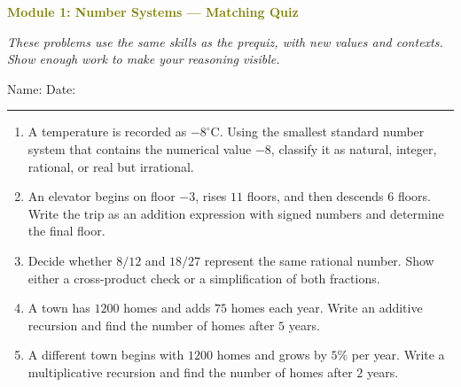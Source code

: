 \documentclass[11pt]{article}
\newcommand{\quizhead}[2]{%
  \clearpage
  {\Large\bfseries\textcolor{olive}{Module #1: #2 — Matching Quiz}}\par
  \textit{These problems use the same skills as the prequiz, with new values and contexts. Show enough work to make your reasoning visible.}\par
  Name: \hspace{2.6in} Date: \hspace{1.1in}\par
  \vspace{2pt}\textcolor{gold}{\rule{\linewidth}{1.2pt}}\par\smallskip
}
\newcommand{\worksmall}{\par\vspace{0.38in}}
\newcommand{\workmed}{\par\vspace{0.62in}}
\begin{document}
\quizhead{1}{Number Systems}
\begin{enumerate}
\item A temperature is recorded as \(-8^\circ\text{C}\). Using the smallest standard number system that contains the numerical value \(-8\), classify it as natural, integer, rational, or real but irrational.
\worksmall

\item An elevator begins on floor \(-3\), rises \(11\) floors, and then descends \(6\) floors. Write the trip as an addition expression with signed numbers and determine the final floor.
\workmed

\item Decide whether \(8/12\) and \(18/27\) represent the same rational number. Show either a cross-product check or a simplification of both fractions.
\workmed

\item A town has \(1200\) homes and adds \(75\) homes each year. Write an additive recursion and find the number of homes after \(5\) years.
\workmed

\item A different town begins with \(1200\) homes and grows by \(5\%\) per year. Write a multiplicative recursion and find the number of homes after \(2\) years.
\workmed
\end{enumerate}
\end{document}
